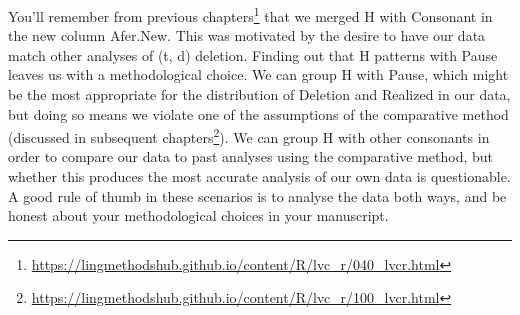 \documentclass[
  10pt,
  letterpaper]{article}
\renewcommand\texttt[1]{{\ttfamily\color{BrickRed}#1}}
\DeclareRobustCommand{\href}[2]{#2\footnote{\url{#1}}}
\begin{document}
\begin{tcolorbox}[enhanced jigsaw, colback=white, left=2mm, bottomtitle=1mm, opacitybacktitle=0.6, breakable, coltitle=black, toptitle=1mm, leftrule=.75mm, title=\textcolor{quarto-callout-warning-color}{\faExclamationTriangle}\hspace{0.5em}{Warning}, opacityback=0, rightrule=.15mm, arc=.35mm, colbacktitle=quarto-callout-warning-color!10!white, bottomrule=.15mm, colframe=quarto-callout-warning-color-frame, toprule=.15mm, titlerule=0mm]

You'll remember from
\href{https://lingmethodshub.github.io/content/R/lvc_r/040_lvcr.html}{previous
chapters} that we merged \texttt{H} with \texttt{Consonant} in the new
column \texttt{Afer.New}. This was motivated by the desire to have our
data match other analyses of (t, d) deletion. Finding out that
\texttt{H} patterns with \texttt{Pause} leaves us with a methodological
choice. We can group \texttt{H} with \texttt{Pause}, which might be the
most appropriate for the distribution of \texttt{Deletion} and
\texttt{Realized} in our data, but doing so means we violate one of the
assumptions of the comparative method (discussed in
\href{https://lingmethodshub.github.io/content/R/lvc_r/100_lvcr.html}{subsequent
chapters}). We can group \texttt{H} with other consonants in order to
compare our data to past analyses using the comparative method, but
whether this produces the most accurate analysis of our own data is
questionable. A good rule of thumb in these scenarios is to analyse the
data both ways, and be honest about your methodological choices in your
manuscript.

\end{tcolorbox}
\end{document}
